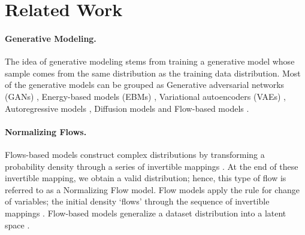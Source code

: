 \documentclass[a4paper,twoside]{article}
\theoremstyle{definition}
\begin{document}
\section{Related Work}
\paragraph{Generative Modeling.}
The idea of generative modeling stems from training a generative model whose sample comes from the same distribution as the training data distribution. Most of the generative models can be grouped as Generative adversarial networks (GANs) \citep{goodfellow2014generative, brock2018large}, Energy-based models (EBMs) \citep{zhang2022generative, song2021maximum}, Variational autoencoders (VAEs) \citep{kingma2013auto, kingma2018variational, hazami2022efficient}, Autoregressive models \citep{oord2016wavenet, nash2020polygen}, Diffusion models \citep{ho2020denoising, song2021scorebased, song2019generative} and Flow-based models \citep{dinh2014nice, dinh2016density, hoogeboom2019emerging,kingma2018glow, ho2019flow++, ma2019macow, nagar2021cinc}. 

\paragraph{Normalizing Flows.}
Flows-based models construct complex distributions by transforming a probability density through a series of invertible mappings \citep{rezende2015variational}. At the end of these invertible mapping, we obtain a valid distribution; hence, this type of flow is referred to as a Normalizing Flow model. Flow models apply the rule for change of variables; the initial density ‘flows’ through the sequence of invertible mappings \citep{dinh2016density}. Flow-based models generalize a dataset distribution into a latent space \citep{kobyzev2020normalizing}.
\end{document}
